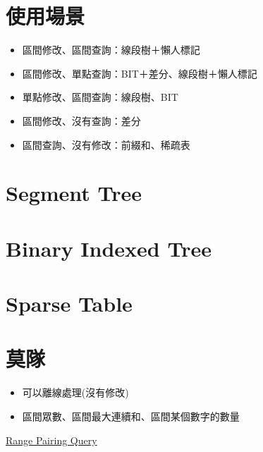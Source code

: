 \documentclass[a4paper]{article}
\title{\Title}
\author{\Author}
\date{\Date}
\begin{document}
\begin{CJK*}{UTF8}{bkai}

    \maketitle
    \thispagestyle{empty}
    \newpage


    \newpage

    \tableofcontents

    \newpage


    \newpage
    \section{使用場景}
    \begin{itemize}
        \item 區間修改、區間查詢：線段樹＋懶人標記
        \item 區間修改、單點查詢：BIT＋差分、線段樹＋懶人標記
        \item 單點修改、區間查詢：線段樹、BIT
        \item 區間修改、沒有查詢：差分
        \item 區間查詢、沒有修改：前綴和、稀疏表
    \end{itemize}

    \newpage
    \section{Segment Tree}
    

    \newpage
    \section{Binary Indexed Tree}
    

    \newpage
    \section{Sparse Table}

    \newpage
    \section{莫隊}
    \begin{itemize}
        \item 可以離線處理(沒有修改)
        \item 區間眾數、區間最大連續和、區間某個數字的數量
    \end{itemize}
    \href{https://atcoder.jp/contests/abc242/tasks/abc242_g}{Range Pairing Query}
    


\end{CJK*}
\end{document}
